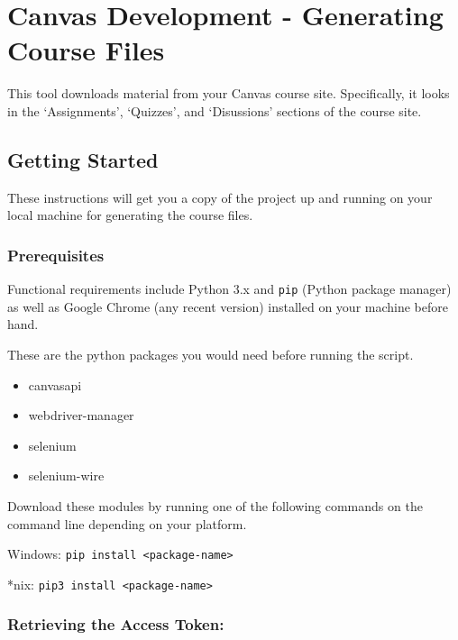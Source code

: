 \documentclass[
]{article}
\date{}
\providecommand{\tightlist}{%
  \setlength{\itemsep}{0pt}\setlength{\parskip}{0pt}}
\begin{document}
\hypertarget{canvas-development---generating-course-files}{%
\section{Canvas Development - Generating Course
Files}\label{canvas-development---generating-course-files}}

This tool downloads material from your Canvas course site. Specifically,
it looks in the `Assignments', `Quizzes', and `Disussions' sections of
the course site.

\hypertarget{getting-started}{%
\subsection{Getting Started}\label{getting-started}}

These instructions will get you a copy of the project up and running on
your local machine for generating the course files.

\hypertarget{prerequisites}{%
\subsubsection{Prerequisites}\label{prerequisites}}

Functional requirements include Python 3.x and \texttt{pip} (Python
package manager) as well as Google Chrome (any recent version) installed
on your machine before hand.

These are the python packages you would need before running the script.

\begin{itemize}
\tightlist
\item
  canvasapi
\item
  webdriver-manager
\item
  selenium
\item
  selenium-wire
\end{itemize}

Download these modules by running one of the following commands on the
command line depending on your platform.

Windows: \texttt{pip\ install\ \textless{}package-name\textgreater{}}

*nix: \texttt{pip3\ install\ \textless{}package-name\textgreater{}}

\hypertarget{retrieving-the-access-token}{%
\subsubsection{Retrieving the Access
Token:}\label{retrieving-the-access-token}}
\end{document}
